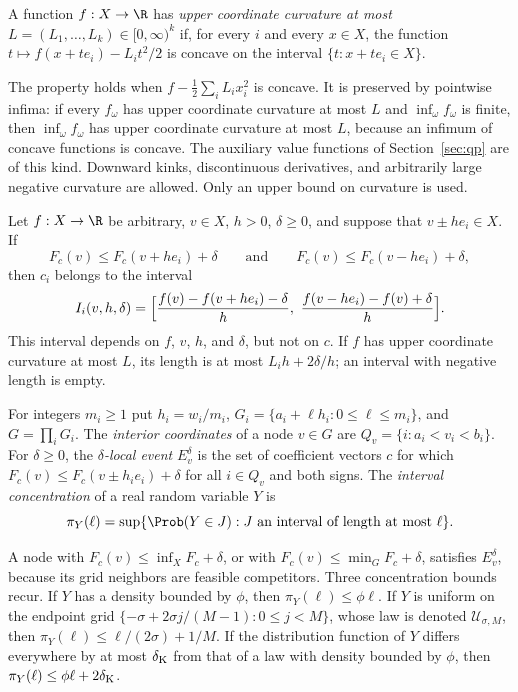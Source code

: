 \begin{definition}\label{def:count:curv}
A function $f:X\to\R$ has \emph{upper coordinate curvature at most}
$L=(L_1,\dots,L_k)\in[0,\infty)^k$ if, for every $i$ and every $x\in X$, the
function $t\mapsto f(x+te_i)-L_it^2/2$ is concave on the interval
$\{t:x+te_i\in X\}$.
\end{definition}

The property holds when $f-\frac12\sum_iL_ix_i^2$ is concave. It is
preserved by pointwise infima: if every $f_\omega$ has upper coordinate
curvature at most $L$ and $\inf_\omega f_\omega$ is finite, then
$\inf_\omega f_\omega$ has upper coordinate curvature at most $L$, because an
infimum of concave functions is concave. The auxiliary value functions of
Section~\ref{sec:qp} are of this kind. Downward kinks, discontinuous
derivatives, and arbitrarily large negative curvature are allowed. Only an
upper bound on curvature is used.

\begin{lemma}\label{lem:count:interval}
Let $f:X\to\R$ be arbitrary, $v\in X$, $h>0$, $\delta\ge0$, and suppose
that $v\pm he_i\in X$. If
\[
 F_c(v)\le F_c(v+he_i)+\delta
 \qquad\text{and}\qquad
 F_c(v)\le F_c(v-he_i)+\delta ,
\]
then $c_i$ belongs to the interval
\[
 I_i(v,h,\delta)=\Bigl[\frac{f(v)-f(v+he_i)-\delta}{h},\
 \frac{f(v-he_i)-f(v)+\delta}{h}\Bigr].
\]
This interval depends on $f$, $v$, $h$, and $\delta$, but not on $c$. If $f$
has upper coordinate curvature at most $L$, its length is at most
$L_ih+2\delta/h$; an interval with negative length is empty.
\end{lemma}

\begin{definition}\label{def:count:local-event}
For integers $m_i\ge1$ put $h_i=w_i/m_i$,
$G_i=\{a_i+\ell h_i:0\le\ell\le m_i\}$, and $G=\prod_iG_i$. The
\emph{interior coordinates} of a node $v\in G$ are
$Q_v=\{i:a_i<v_i<b_i\}$. For $\delta\ge0$, the \emph{$\delta$-local event}
$E_v^\delta$ is the set of coefficient vectors $c$ for which
$F_c(v)\le F_c(v\pm h_ie_i)+\delta$ for all $i\in Q_v$ and both signs. The
\emph{interval concentration} of a real random variable $Y$ is
\[
 \pi_Y(\ell)=\sup\{\Prob(Y\in J): J\text{ an interval of length at most }\ell\}.
\]
\end{definition}

A node with $F_c(v)\le\inf_XF_c+\delta$, or with
$F_c(v)\le\min_GF_c+\delta$, satisfies $E_v^\delta$, because its grid
neighbors are feasible competitors. Three concentration bounds recur. If $Y$
has a density bounded by $\phi$, then $\pi_Y(\ell)\le\phi\ell$. If $Y$ is
uniform on the endpoint grid $\{-\sigma+2\sigma j/(M-1):0\le j<M\}$, whose
law is denoted $\mathcal U_{\sigma,M}$, then $\pi_Y(\ell)\le\ell/(2\sigma)+1/M$.
If the distribution function of $Y$ differs everywhere by at most
$\delta_{\rm K}$ from that of a law with density bounded by $\phi$, then
$\pi_Y(\ell)\le\phi\ell+2\delta_{\rm K}$.

